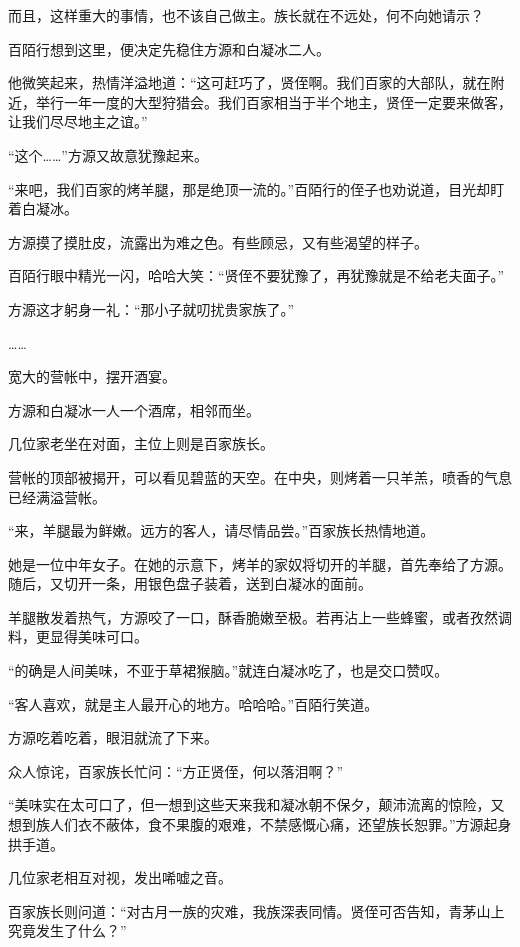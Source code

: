 \begin{this_body}
而且，这样重大的事情，也不该自己做主。族长就在不远处，何不向她请示？

百陌行想到这里，便决定先稳住方源和白凝冰二人。

他微笑起来，热情洋溢地道：“这可赶巧了，贤侄啊。我们百家的大部队，就在附近，举行一年一度的大型狩猎会。我们百家相当于半个地主，贤侄一定要来做客，让我们尽尽地主之谊。”

“这个……”方源又故意犹豫起来。

“来吧，我们百家的烤羊腿，那是绝顶一流的。”百陌行的侄子也劝说道，目光却盯着白凝冰。

方源摸了摸肚皮，流露出为难之色。有些顾忌，又有些渴望的样子。

百陌行眼中精光一闪，哈哈大笑：“贤侄不要犹豫了，再犹豫就是不给老夫面子。”

方源这才躬身一礼：“那小子就叨扰贵家族了。”

……

宽大的营帐中，摆开酒宴。

方源和白凝冰一人一个酒席，相邻而坐。

几位家老坐在对面，主位上则是百家族长。

营帐的顶部被揭开，可以看见碧蓝的天空。在中央，则烤着一只羊羔，喷香的气息已经满溢营帐。

“来，羊腿最为鲜嫩。远方的客人，请尽情品尝。”百家族长热情地道。

她是一位中年女子。在她的示意下，烤羊的家奴将切开的羊腿，首先奉给了方源。随后，又切开一条，用银色盘子装着，送到白凝冰的面前。

羊腿散发着热气，方源咬了一口，酥香脆嫩至极。若再沾上一些蜂蜜，或者孜然调料，更显得美味可口。

“的确是人间美味，不亚于草裙猴脑。”就连白凝冰吃了，也是交口赞叹。

“客人喜欢，就是主人最开心的地方。哈哈哈。”百陌行笑道。

方源吃着吃着，眼泪就流了下来。

众人惊诧，百家族长忙问：“方正贤侄，何以落泪啊？”

“美味实在太可口了，但一想到这些天来我和凝冰朝不保夕，颠沛流离的惊险，又想到族人们衣不蔽体，食不果腹的艰难，不禁感慨心痛，还望族长恕罪。”方源起身拱手道。

几位家老相互对视，发出唏嘘之音。

百家族长则问道：“对古月一族的灾难，我族深表同情。贤侄可否告知，青茅山上究竟发生了什么？”

\end{this_body}

